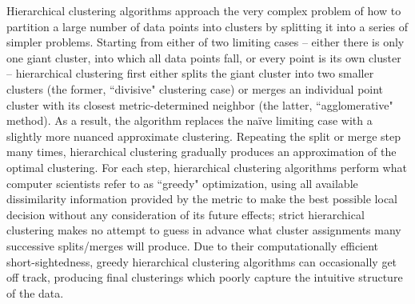 Hierarchical clustering algorithms approach the very complex problem of how to partition a large number of data points into clusters by splitting it into a series of simpler problems.  Starting from either of two limiting cases -- either there is only one giant cluster, into which all data points fall, or every point is its own cluster -- hierarchical clustering first either splits the giant cluster into two smaller clusters (the former, ``divisive" clustering case) or merges an individual point cluster with its closest metric-determined neighbor (the latter, ``agglomerative"  method).  As a result, the algorithm replaces the na\"{i}ve limiting case with a slightly more nuanced approximate clustering.  Repeating the split or merge step many times, hierarchical clustering gradually produces an approximation of the optimal clustering.  For each step, hierarchical clustering algorithms perform what computer scientists refer to as ``greedy" optimization, using all available dissimilarity information provided by the metric to make the best possible local decision without any consideration of its future effects; strict hierarchical clustering makes no attempt to guess in advance what cluster assignments many successive splits/merges will produce.  Due to their computationally efficient short-sightedness, greedy hierarchical clustering algorithms can occasionally get off track, producing final clusterings which poorly capture the intuitive structure of the data.

